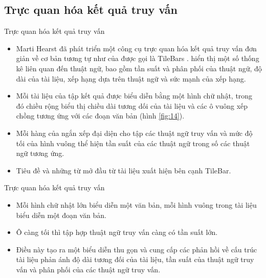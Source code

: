 \documentclass[10pt]{beamer}
\theoremstyle{remark}
\theoremstyle{definition}
\begin{document}
\subsection{Trực quan hóa kết quả truy vấn}

\begin{frame}{Trực quan hóa kết quả truy vấn}
	\begin{itemize}
		\item Marti Hearst đã phát triển một công cụ trực quan hóa kết quả truy vấn đơn giản về cơ bản tương tự như của \cite{232} được gọi là TileBars \cite{178}.
		hiển thị một số thống kê liên quan đến thuật ngữ, bao gồm tần suất và phân phối của thuật ngữ, độ dài của tài liệu, xếp hạng dựa trên thuật ngữ và sức mạnh của xếp hạng.
		\item  Mỗi tài liệu của tập kết quả được biểu diễn bằng một hình chữ nhật, trong đó chiều rộng biểu thị chiều dài tương dối của tài liệu và các ô vuông xếp chồng tương ứng với các đoạn văn bản (hình \ref{fig:14}).
		\item Mỗi hàng của ngắn xếp đại diện cho tập các thuật ngữ truy vấn và mức độ tối của hình vuông thể hiện tần suất của các thuật ngữ trong số các thuật ngữ tương ứng.
		\item Tiêu đề và những từ mở đầu từ tài liệu xuất hiện bên cạnh TileBar.
	\end{itemize}
\end{frame}

\begin{frame}{Trực quan hóa kết quả truy vấn}
	\begin{itemize}
		\item  Mỗi hình chữ nhật lớn biểu diễn một văn bản, mỗi hình vuông trong tài liệu biểu diễn một đoạn văn bản.
		\item Ô càng tối thì tập hợp thuật ngữ truy vấn càng có tần suất lớn.
		\item Điều này tạo ra một biểu diễn thu gọn và cung cấp các phản hồi về cấu trúc tài liệu phản ánh độ dài tương đối của tài liệu,
		tần suất của thuật ngữ truy vấn và phân phối của các thuật ngữ truy vấn.
	\end{itemize}
\end{frame}
\end{document}
